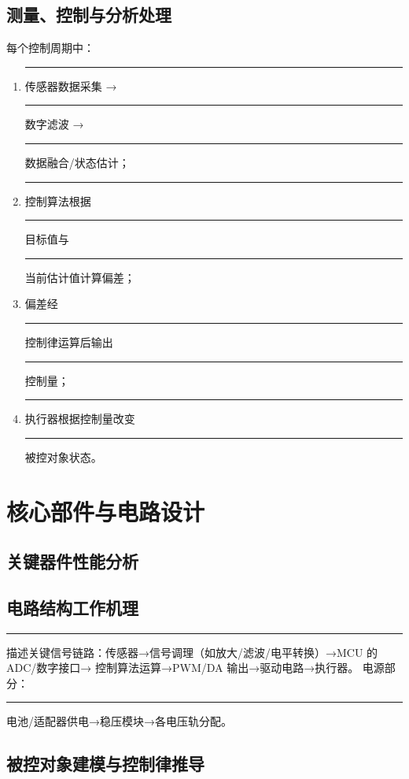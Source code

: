\documentclass[12pt,a4paper,fontset=fandol]{ctexart}
\newcommand{\blank}{\rule{4cm}{0.4pt}}
\begin{document}
\subsection{测量、控制与分析处理}
每个控制周期中：
\begin{enumerate}
  \item \blank{传感器}数据采集 → \blank{数字滤波} → \blank{数据融合/状态估计}；
  \item \blank{控制算法}根据\blank{目标值}与\blank{当前估计值}计算偏差；
  \item 偏差经\blank{控制律}运算后输出\blank{控制量}；
  \item \blank{执行器}根据控制量改变\blank{被控对象状态}。
\end{enumerate}

\section{核心部件与电路设计}

\subsection{关键器件性能分析}

\subsection{电路结构工作机理}
\blank{描述关键信号链路：传感器→信号调理（如放大/滤波/电平转换）→MCU 的 ADC/数字接口→
控制算法运算→PWM/DA 输出→驱动电路→执行器。}
电源部分：\blank{电池/适配器供电→稳压模块→各电压轨分配}。

\subsection{被控对象建模与控制律推导}
\end{document}
